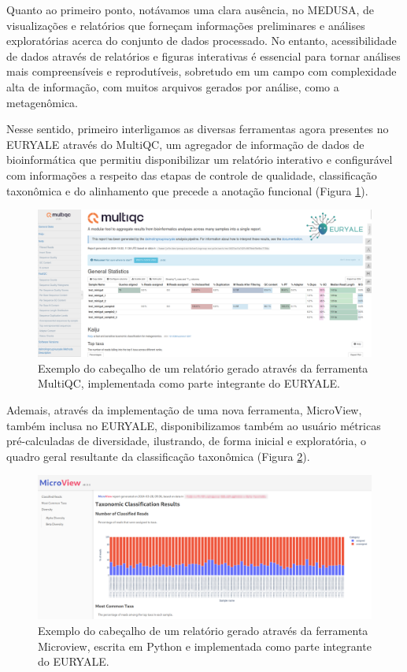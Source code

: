 \documentclass[
	12pt,				%
	oneside,			%
	a4paper,			%
	chapter=TITLE,		%
	section=TITLE,		%
	english,			%
	brazil				%
	]{abntex2}
\begin{document}
Quanto ao primeiro ponto, notávamos uma clara ausência, no MEDUSA, de visualizações e relatórios que forneçam informações preliminares e análises exploratórias acerca do conjunto de dados processado. No entanto, acessibilidade de dados através de relatórios e figuras interativas é essencial para tornar análises mais compreensíveis e reprodutíveis, sobretudo em um campo com complexidade alta de informação, com muitos arquivos gerados por análise, como a metagenômica.

Nesse sentido, primeiro interligamos as diversas ferramentas agora presentes no EURYALE através do MultiQC, um agregador de informação de dados de bioinformática \autocite{ewels2016} que permitiu disponibilizar um relatório interativo e configurável com informações a respeito das etapas de controle de qualidade, classificação taxonômica e do alinhamento que precede a anotação funcional (Figura \ref{fig:multiqc}).
\begin{figure}[H]

{\centering \includegraphics[width=0.7\linewidth]{figure/multiqc_example} 

}

\caption{Exemplo do cabeçalho de um relatório gerado através da ferramenta MultiQC, implementada como parte integrante do EURYALE.}\label{fig:multiqc}
\end{figure}
Ademais, através da implementação de uma nova ferramenta, MicroView, também inclusa no EURYALE, disponibilizamos também ao usuário métricas pré-calculadas de diversidade, ilustrando, de forma inicial e exploratória, o quadro geral resultante da classificação taxonômica (Figura \ref{fig:microview}).
\begin{figure}[H]

{\centering \includegraphics[width=0.7\linewidth]{figure/microview_example} 

}

\caption{Exemplo do cabeçalho de um relatório gerado através da ferramenta Microview, escrita em Python e implementada como parte integrante do EURYALE.}\label{fig:microview}
\end{figure}
\end{document}
